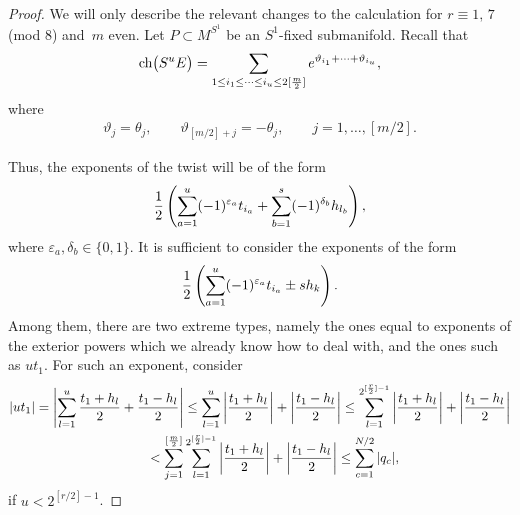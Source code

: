 \documentclass[10pt,a4paper]{amsart}
\newcommand{\ch}{\mbox{\rm ch}}
\numberwithin{equation}{section}
\begin{document}
\begin{proof}
We will only describe the relevant changes to the calculation for $r\equiv 1,\, 7$ (mod 8) and~$m$ even. Let $P\subset M^{S^1}$ be an $S^1$-f\/ixed submanifold. Recall that
\begin{gather*}
 \ch\big(S^uE\big) = \sum_{1\leq i_1\leq\dots\leq i_u\leq 2[\frac{m}{2}]}e^{\vartheta_{i_1} +\dots+\vartheta_{i_u}},
\end{gather*}
where
\begin{gather*}
 \vartheta_j = \theta_j,\qquad \vartheta_{[m/2]+j} = -\theta_j, \qquad j=1,\dots,[m/2].
\end{gather*}

Thus, the exponents of the twist will be of the form
 \begin{gather*}{1\over 2}\left(\sum_{a=1}^u (-1)^{\varepsilon_a}t_{i_a}+\sum_{b=1}^s (-1)^{\delta_b}h_{l_b}\right),\end{gather*}
where $\varepsilon_a,\delta_b\in \{ 0,1 \}$. It is suf\/f\/icient to consider the exponents of the form
\begin{gather*}{1\over 2}\left(\sum_{a=1}^u (-1)^{\varepsilon_a}t_{i_a}\pm sh_k\right).\end{gather*}
Among them, there are two extreme types, namely the ones equal to exponents of the exterior powers which we already know how to deal with, and the ones such as $u t_1$. For such an exponent, consider
\begin{gather*}
 |ut_1| = \left|\sum_{l=1}^u{t_1+h_l\over 2} + {t_1-h_l\over 2}\right|
 \leq \sum_{l=1}^u\left|{t_1+h_l\over 2}\right| + \left|{t_1-h_l\over 2}\right|
\leq \sum_{l=1}^{2^{[{r\over 2}]-1}}\left|{t_1+h_l\over 2}\right| + \left|{t_1-h_l\over 2}\right|\\
\hphantom{|ut_1|}{} < \sum_{j=1}^{[{m\over 2}]}\sum_{l=1}^{2^{[{r\over 2}]-1}}\left|{t_1+h_l\over 2}\right| + \left|{t_1-h_l\over 2}\right|
\leq \sum_{c=1}^{N/2} |q_c|,
\end{gather*}
if $u<2^{[r/2]-1}$.
\end{proof}
\end{document}
